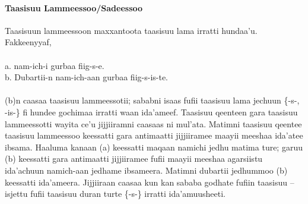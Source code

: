 \documentclass[11pt,b5paper]{book}
\begin{document}
\paragraph{Taasisuu Lammeessoo/Sadeessoo}
Taasisuun lammeessoon maxxantoota taasisuu lama irratti hundaa’u. Fakkeenyyaf, \\
\\
a. nam-ich-i gurbaa fiig-s-e.\\
b. Dubartii-n nam-ich-aan gurbaa fiig-s-is-te.\\
\\
(b)n caasaa taasisuu lammeessotii; sababni isaas fufii taasisuu lama jechuun \{-s-, -is-\} fi hundee gochimaa irratti waan ida’ameef. Taasisuu qeenteen gara taasisuu lammeessotti wayita ce’u jijjiiramni caasaas ni mul’ata. Matimni taasisuu qeentee taasisuu lammeessoo keessatti gara antimaatti
jijjiiramee maayii meeshaa ida’atee ibsama. Haaluma kanaan (a) keessatti maqaan namichi jedhu matima ture; garuu (b) keessatti gara antimaatti jijjiiramee fufii maayii meeshaa agarsiistu ida’achuun namich-aan jedhame ibsameera. Matimni dubartii jedhummoo (b) keessatti ida’ameera.
Jijjiiraan caasaa kun kan sababa godhate fufiin taasisuu –isjettu fufii taasisuu duran turte \{-s-\} irratti ida’amuusheeti.
\end{document}

